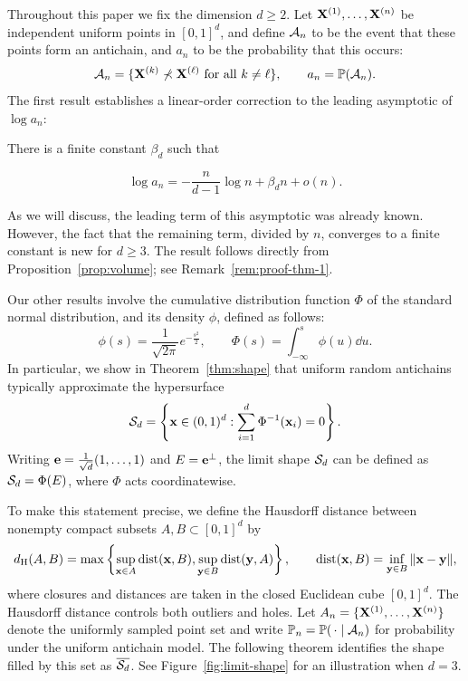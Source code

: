 \documentclass[11pt,letterpaper]{article}
\begin{document}
Throughout this paper we fix the dimension $d\ge2$. Let $\mathbf X^{(1)},\ldots,\mathbf X^{(n)}$ be independent uniform points in $[0,1]^d$, and define $\mathcal A_n$ to be the event that these points form an antichain, and $a_{n}$ to be the probability that this occurs:
\[
      \mathcal A_n=\{\mathbf X^{(k)}\not\prec\mathbf X^{(\ell)}\text{ for all }k\ne\ell\}, \qquad a_n=\mathbb P(\mathcal A_n).
\]
The first result establishes a linear-order correction to the leading asymptotic of $\log a_n$:
\begin{theorem}\label{thm:counting}
      There is a finite constant $\beta_d$ such that

      \begin{equation}\label{eq:counting}
            \log a_n=-\frac n{d-1}\log n+\beta_d n+o(n).
      \end{equation}
\end{theorem}
As we will discuss, the leading term of this asymptotic was already known. However, the fact that the remaining term, divided by $n$, converges to a finite constant is new for $d\ge3$. The result follows directly from Proposition~\ref{prop:volume}; see Remark~\ref{rem:proof-thm-1}.

Our other results involve the cumulative distribution function $\Phi$ of the standard normal distribution, and its density $\phi$, defined as follows:
\[
      \phi(s)=\frac1{\sqrt{2\pi}}e^{-\frac{s^2}{2}},\qquad \Phi(s)=\int_{-\infty}^s\phi(u)\dd u.
\]
In particular, we show in Theorem~\ref{thm:shape} that uniform random antichains typically approximate the hypersurface
\[
      \mathcal S_d=\left\{\mathbf x\in(0,1)^d:\sum_{i=1}^d\Phi^{-1}(\mathbf x_i)=0\right\}.
\]
Writing $\mathbf e=\frac{1}{\sqrt d}(1,\ldots,1)$ and $E=\mathbf e^\perp$, the limit shape $\mathcal S_d$ can be defined as $\mathcal S_d=\Phi(E)$, where $\Phi$ acts coordinatewise.

To make this statement precise, we define the Hausdorff distance between nonempty compact subsets $A,B\subset[0,1]^d$ by
\[
      d_{\rm H}(A,B)=\max\left\{\sup_{\mathbf x\in A}\operatorname{dist}(\mathbf x,B), \sup_{\mathbf y\in B}\operatorname{dist}(\mathbf y,A)\right\}, \qquad \operatorname{dist}(\mathbf x,B)=\inf_{\mathbf y\in B}\|\mathbf x-\mathbf y\|,
\]
where closures and distances are taken in the closed Euclidean cube $[0,1]^d$.
The Hausdorff distance controls both outliers and holes. Let $A_n=\{\mathbf X^{(1)},\ldots,\mathbf X^{(n)}\}$ denote the uniformly sampled point set and write $\mathbb P_n=\mathbb P(\,\cdot\mid\mathcal A_n)$ for probability under the uniform antichain model.
The following theorem identifies the shape filled by this set as $\overline{\mathcal S_d}$.
See Figure~\ref{fig:limit-shape} for an illustration when $d=3$.
\end{document}
